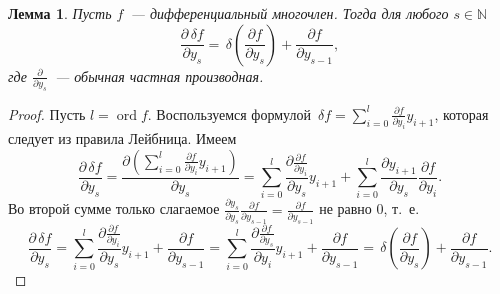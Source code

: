\documentclass[11pt]{article}
\DeclareMathOperator{\ord}{ord}
\newtheorem{lemma}[theorem1]{Лемма}
\theoremstyle{plain}
\theoremstyle{definition}
\theoremstyle{remark}
\begin{document}
\begin{lemma}\label{lemma:commutative derivatives}
Пусть $f$~--- дифференциальный многочлен. Тогда для любого $s\in\mathbb{N}$ 
$$
\frac{\partial \,\delta f}{\partial y_s}=\,\delta \left(\frac{\partial f}{\partial y_s}\right)+\frac{\partial f}{\partial y_{s-1}},
$$
где $\frac{\partial}{\partial y_s}$~--- обычная частная производная.
\end{lemma}
\begin{proof}
Пусть $l=\ord f$.
Воспользуемся формулой $\,\delta f=\sum\limits_{i=0}^l\frac{\partial f}{\partial y_i}y_{i+1}$, которая следует из правила Лейбница. Имеем 
$$
\frac{\partial \,\delta f}{\partial y_s}=\frac{\partial\left(\sum\limits_{i=0}^l\frac{\partial f}{\partial y_i}y_{i+1}\right)}{\partial y_s}=\sum\limits_{i=0}^l\frac{\partial \frac{\partial f}{\partial y_i} }{\partial y_s}y_{i+1}+\sum\limits_{i=0}^l\frac{\partial y_{i+1}}{\partial y_s}\frac{\partial f}{\partial y_i}.
$$
Во второй сумме только слагаемое 
$\frac{\partial y_{s}}{\partial y_s}\frac{\partial f}{\partial y_{s-1}}=\frac{\partial f}{\partial y_{s-1}}$ 
не равно 0, т.~е. 
$$
\frac{\partial \,\delta f}{\partial y_s}=\sum\limits_{i=0}^l\frac{\partial \frac{\partial f}{\partial y_i}}{\partial y_s}y_{i+1}+\frac{\partial f}{\partial y_{s-1}}=\sum\limits_{i=0}^l\frac{\partial \frac{\partial f}{\partial y_s}}{\partial y_i}y_{i+1}+\frac{\partial f}{\partial y_{s-1}}=\,\delta\left(\frac{\partial f}{\partial y_s}\right)+\frac{\partial f}{\partial y_{s-1}}.
$$
\end{proof}
\end{document}
